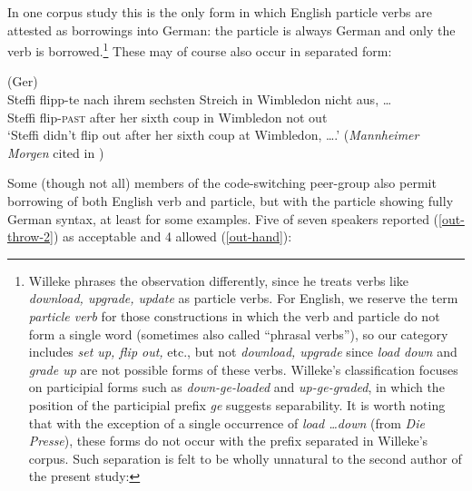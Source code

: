 \documentclass[output=paper]{langscibook}
\begin{document}
In one corpus study \citep{willeke06} this is the only form in which English particle verbs are attested as borrowings into German: the particle is always German and only the verb is borrowed.\footnote{Willeke phrases the observation differently, since he treats verbs like \textit{download, upgrade, update} as particle verbs. For English, we reserve the term \textit{particle verb} for those constructions in which the verb and particle do not form a single word (sometimes also called ``phrasal verbs''), so our category includes \textit{set up, flip out,} etc., but not \textit{download, upgrade} since \textit{load down} and \textit{grade up} are not possible forms of these verbs. Willeke's classification focuses on participial forms such as \textit{down-ge-loaded} and \textit{up-ge-graded}, in which the position of the participial prefix \textit{ge} suggests separability. It is worth noting that with the exception of a single occurrence of \textit{load \ldots down} (from \textit{Die Presse}), these forms do not occur with the prefix separated in Willeke's corpus. Such separation is felt to be wholly unnatural to the second author of the present study:

\ea
{}
\z\z

} These may of course also occur in separated form:

\ea(Ger)\\\gll Steffi flipp-te nach ihrem sechsten Streich in Wimbledon nicht aus, \ldots\\
Steffi flip-\textsc{past} after her sixth coup in Wimbledon not out\\
\glt `Steffi didn't flip out after her sixth coup at Wimbledon, \ldots.' (\textit{Mannheimer Morgen} cited in \citealp[67]{willeke06})
\z 

Some (though not all) members of the code-switching peer-group also permit borrowing of both English verb and particle, but with the particle showing fully German syntax, at least for some examples. Five of seven speakers reported (\ref{out-throw-2}) as acceptable and 4 allowed (\ref{out-hand}):\largerpage

\ea\label{part.eng-verb}\judgewidth{\%}
\z\z 
\end{document}
